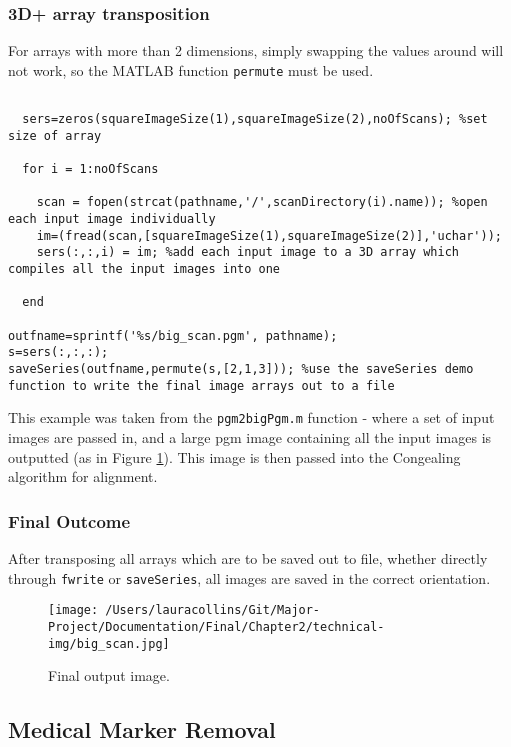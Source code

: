 \subsubsection{3D+ array transposition}

For arrays with more than 2 dimensions, simply swapping the values around will not work, so the MATLAB function \texttt{permute} \cite{permute} must be used.

\begin{lstlisting}[style=Matlab-editor,frame=single]

  sers=zeros(squareImageSize(1),squareImageSize(2),noOfScans); %set size of array

  for i = 1:noOfScans

    scan = fopen(strcat(pathname,'/',scanDirectory(i).name)); %open each input image individually
    im=(fread(scan,[squareImageSize(1),squareImageSize(2)],'uchar'));
    sers(:,:,i) = im; %add each input image to a 3D array which compiles all the input images into one

  end

outfname=sprintf('%s/big_scan.pgm', pathname);
s=sers(:,:,:);
saveSeries(outfname,permute(s,[2,1,3])); %use the saveSeries demo function to write the final image arrays out to a file

\end{lstlisting}

This example was taken from the \texttt{pgm2bigPgm.m} function - where a set of input images are passed in, and a large pgm image containing all the input images is outputted (as in Figure \ref{fig:final-output-4}). This image is then passed into the Congealing algorithm for alignment.

\subsubsection{Final Outcome}

After transposing all arrays which are to be saved out to file, whether directly through \texttt{fwrite} or \texttt{saveSeries}, all images are saved in the correct orientation.

\begin{figure}[H]
  \centering
  \texttt{[image: /Users/lauracollins/Git/Major-Project/Documentation/Final/Chapter2/technical-img/big\_scan.jpg]}
  \caption{Final output image.}
  \label{fig:final-output-4}
\end{figure}

\subsection{Medical Marker Removal}

